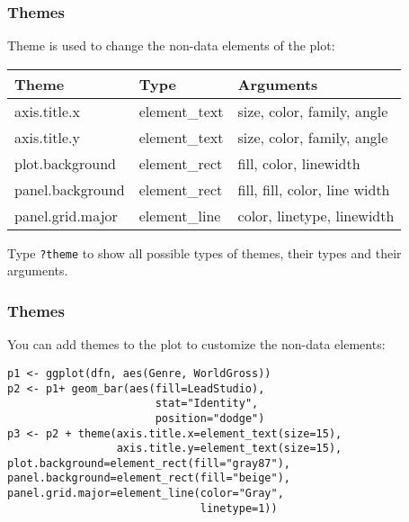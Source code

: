 \documentclass{beamer}
\begin{document}
	\begin{frame}[fragile]
		\frametitle{Themes}

		Theme is used to change the non-data elements of the plot:

		\vspace{1em}

		\begin{center}
		\begin{tabular}{|l|l|l|}
		\hline
    		Theme & Type & Arguments \\ 
		\hline
		axis.title.x & element\_text & size, color, family, angle \\
		\hline
		axis.title.y & element\_text & size, color, family, angle \\
		\hline
		plot.background & element\_rect & fill, color, linewidth \\
		\hline
		panel.background & element\_rect & fill, fill, color, line width \\
		\hline
		panel.grid.major & element\_line & color, linetype, linewidth \\
		\hline
		\end{tabular}
		\end{center}

		\vspace{1em}

		Type \verb|?theme| to show all possible types of themes, their types and their arguments.

	\end{frame}

	\begin{frame}[fragile]
		\frametitle{Themes}

		You can add themes to the plot to customize the non-data elements:

		\vspace{1em}

		\begin{exampleblock}{}
		\begin{BVerbatim}
p1 <- ggplot(dfn, aes(Genre, WorldGross)) 
p2 <- p1+ geom_bar(aes(fill=LeadStudio), 
                       stat="Identity",
                       position="dodge")
p3 <- p2 + theme(axis.title.x=element_text(size=15),
                 axis.title.y=element_text(size=15),
plot.background=element_rect(fill="gray87"),
panel.background=element_rect(fill="beige"),
panel.grid.major=element_line(color="Gray",
                              linetype=1))
		\end{BVerbatim}
		\end{exampleblock}{}

	\end{frame}
\end{document}

